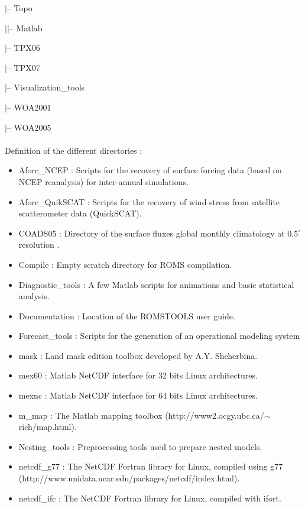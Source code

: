 $|$-- Topo

$|$\hspace{0.5cm}$|$-- Matlab

$|$-- TPX06

$|$-- TPX07

$|$-- Visualization\_tools

$|$-- WOA2001

$|$-- WOA2005
\\
\\
Definition of the different directories :
\begin{itemize}
\item Aforc\_NCEP : Scripts for the recovery of surface forcing data 
      (based on NCEP reanalysis) for inter-annual simulations.
\item Aforc\_QuikSCAT : Scripts for the recovery of wind stress from 
      satellite scatterometer data (QuickSCAT).
\item COADS05 : Directory of the surface fluxes global monthly 
      climatology at $0.5^\circ$ resolution \citep{Das94}.
\item Compile : Empty scratch directory for ROMS compilation.
\item Diagnostic\_tools : A few Matlab scripts for animations and
      basic statistical analysis.
\item Documentation : Location of the ROMSTOOLS user guide.
\item Forecast\_tools : Scripts for the generation of an operational
      modeling system 
\item mask : Land mask edition toolbox developed by A.Y. Shcherbina.
\item mex60 : Matlab NetCDF interface for 32 bits Linux architectures.
\item mexnc : Matlab NetCDF interface for 64 bits Linux architectures.
\item m\_map : The Matlab mapping toolbox 
      (http://www2.ocgy.ubc.ca/$\sim$rich/map.html).
\item Nesting\_tools : Preprocessing tools used to prepare nested
      models.
\item netcdf\_g77 : The NetCDF Fortran library for Linux, compiled using g77\\
      (http://www.unidata.ucar.edu/packages/netcdf/index.html).
\item netcdf\_ifc : The NetCDF Fortran library for Linux, compiled with ifort. 

\end{itemize}
